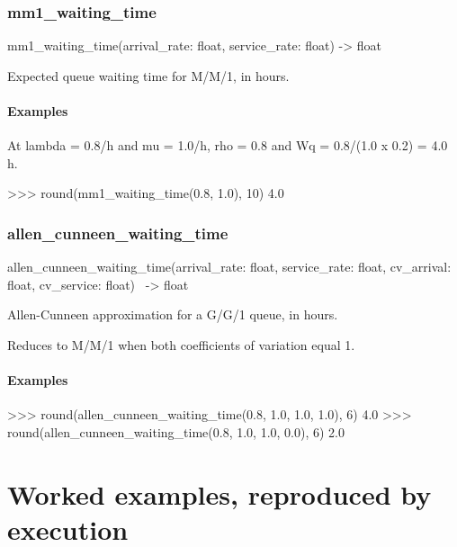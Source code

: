 \documentclass[10pt,a4paper,twoside]{report}
\begin{document}
\subsubsection*{mm1\_waiting\_time}

\begin{verbatimsmall}
mm1_waiting_time(arrival_rate: float, service_rate: float) -> float
\end{verbatimsmall}

Expected queue waiting time for M/M/1, in hours.

\paragraph*{Examples}

At lambda = 0.8/h and mu = 1.0/h, rho = 0.8 and Wq = 0.8/(1.0 x 0.2) = 4.0 h.

\begin{doctestblock}
>>> round(mm1_waiting_time(0.8, 1.0), 10)
4.0
\end{doctestblock}

\subsubsection*{allen\_cunneen\_waiting\_time}

\begin{verbatimsmall}
allen_cunneen_waiting_time(arrival_rate: float, service_rate: float, cv_arrival: float, cv_service: float)
    \  -> float
\end{verbatimsmall}

Allen-Cunneen approximation for a G/G/1 queue, in hours.

Reduces to M/M/1 when both coefficients of variation equal 1.

\paragraph*{Examples}

\begin{doctestblock}
>>> round(allen_cunneen_waiting_time(0.8, 1.0, 1.0, 1.0), 6)
4.0
>>> round(allen_cunneen_waiting_time(0.8, 1.0, 1.0, 0.0), 6)
2.0
\end{doctestblock}

\section{Worked examples, reproduced by execution}
\end{document}
